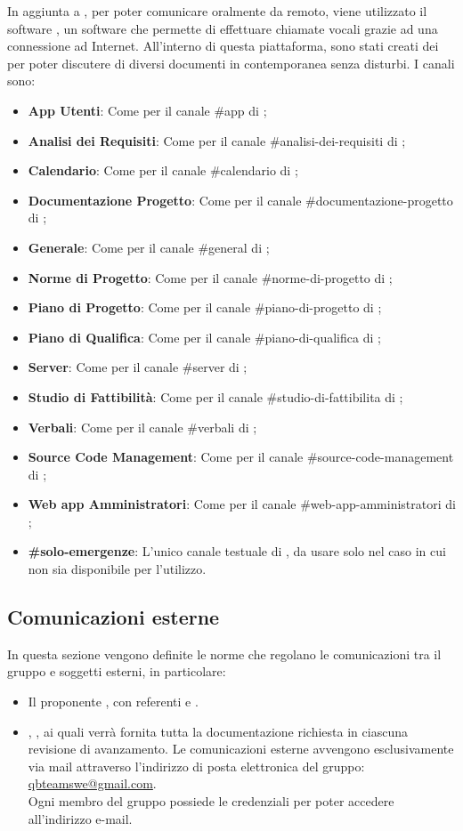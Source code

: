 In aggiunta a , per poter comunicare oralmente da remoto, viene utilizzato il software , un software che permette di effettuare chiamate vocali grazie ad una connessione ad Internet.
All'interno di questa piattaforma, sono stati creati dei  per poter discutere di diversi documenti in contemporanea senza disturbi.
I canali sono:
\begin{itemize}
	\item \textbf{App Utenti}: Come per il canale \#app di ;
	\item \textbf{Analisi dei Requisiti}: Come per il canale \#analisi-dei-requisiti di ;
	\item \textbf{Calendario}: Come per il canale \#calendario di ;
	\item \textbf{Documentazione Progetto}: Come per il canale \#documentazione-progetto di ;
	\item \textbf{Generale}: Come per il canale \#general di ;
	\item \textbf{Norme di Progetto}: Come per il canale \#norme-di-progetto di ;
    \item \textbf{Piano di Progetto}: Come per il canale \#piano-di-progetto di ;
	\item \textbf{Piano di Qualifica}: Come per il canale \#piano-di-qualifica di ;
	\item \textbf{Server}: Come per il canale \#server di ;
	\item \textbf{Studio di Fattibilità}: Come per il canale \#studio-di-fattibilita di ;
	\item \textbf{Verbali}: Come per il canale \#verbali di ;
	\item \textbf{Source Code Management}: Come per il canale \#source-code-management di ;
	\item \textbf{Web app Amministratori}: Come per il canale \#web-app-amministratori di ;
	\item \textbf{\#solo-emergenze}: L'unico canale testuale di , da usare solo nel caso in cui  non sia disponibile per l'utilizzo.
\end{itemize}

\subsection{Comunicazioni esterne}
In questa sezione vengono definite le norme che regolano le comunicazioni tra il gruppo e soggetti esterni, in particolare:
\begin{itemize}
	\item Il proponente \Proponente{}, con referenti \ZD{}{} e \CT{}.
	\item \VT{}, \CR{}, ai quali verrà fornita tutta la documentazione richiesta in ciascuna revisione di avanzamento.
	Le comunicazioni esterne avvengono esclusivamente via mail attraverso l’indirizzo di posta elettronica del gruppo:
	\url{qbteamswe@gmail.com}. \\
	Ogni membro del gruppo possiede le credenziali per poter accedere all’indirizzo e-mail.
\end{itemize}
	
